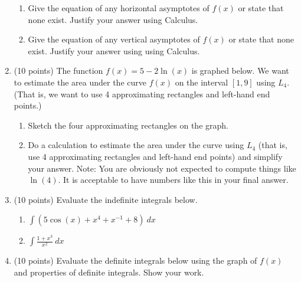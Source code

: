 \documentclass[12pt]{article}
\begin{document}
\begin{enumerate}
\begin{enumerate}
\item Give the equation of any horizontal asymptotes of $f(x)$ or state that none exist. Justify your answer using Calculus. 
\vfill
\item  Give the equation of any vertical asymptotes of $f(x)$ or state that none exist. Justify your answer using  using Calculus. 
\vfill
\end{enumerate}

\newpage

\item (10 points) The function $f(x)=5-2 \ln(x)$ is graphed below. We want to estimate the area under the curve $f(x)$ on the interval $[1,9]$ using $L_4.$ (That is, we want to use 4 approximating rectangles and left-hand end points.) 
\begin{enumerate}
\item Sketch the four approximating rectangles on the graph. 

\vspace{0.5in}
\item Do a calculation to estimate the area under the curve using $L_4$ (that is, use 4 approximating rectangles and left-hand end points) and simplify your answer.  Note: You are obviously not expected to compute things like $\ln(4)$. It is acceptable to have numbers like this in your final answer.\\


\end{enumerate}
\newpage
\item (10 points) Evaluate the indefinite integrals below. 
	\begin{enumerate}
	\item $ \displaystyle \int (5\cos(x)+x^{4} + x^{-1}+8) \: dx$
	\vfill
	\item $ \displaystyle \int\frac{1+x^3}{x^2} \: dx $
	\vfill
	\end{enumerate}
	
\item (10 points) Evaluate the definite integrals below using the graph of $f(x)$ and properties of definite integrals. Show your work.


\end{enumerate}
\end{document}
